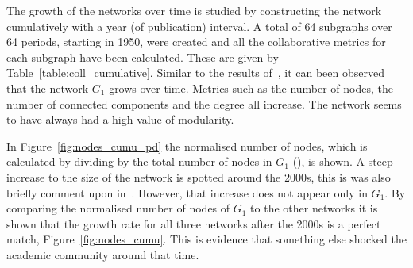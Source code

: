 \documentclass{article}
\theoremstyle{definition}
\newcommand{\authors}{}
\begin{document}
The growth of the networks over time is studied by constructing the network
cumulatively with a year (of publication) interval. A total of 64 subgraphs
over 64 periods, starting in 1950, were created and all the collaborative metrics
for each subgraph have been calculated. These are given by Table~\ref{table:coll_cumulative}.
Similar to the results of~\cite{Liu2015}, it can been observed that the network \(G_1\)
grows over time. Metrics such as the number of nodes, the number of connected components and
the degree all increase. The network seems to have always had a high value of modularity.

In Figure~\ref{fig:nodes_cumu_pd} the normalised number of nodes,
which is calculated by dividing by the total number of nodes in \(G_1\) (\authors),
is shown. A steep increase to the size of the network is spotted around the 2000s,
this is was also briefly comment upon in~\cite{Liu2015}. However, that increase
does not appear only in \(G_1\). By comparing the normalised
number of nodes of \(G_1\) to the other networks it is shown that the growth rate
for all three networks after the 2000s is a perfect match, Figure~\ref{fig:nodes_cumu}.
This is evidence that something else shocked the academic community around that time.
\end{document}
